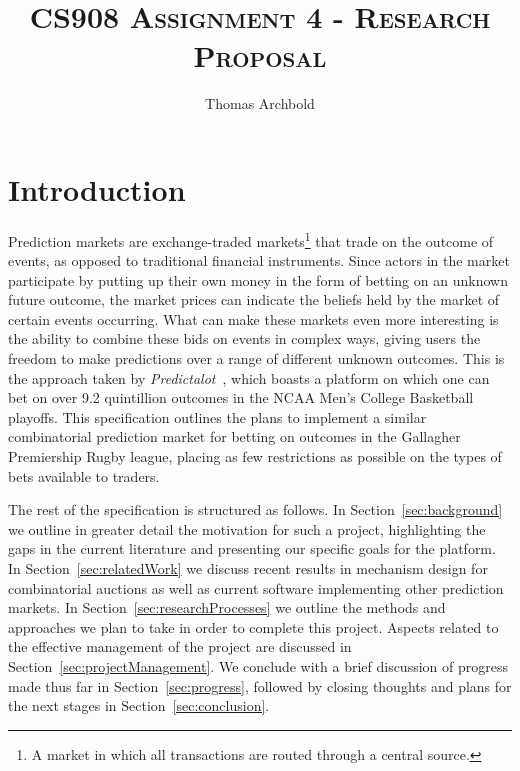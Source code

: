 \documentclass[10pt,a4paper]{article}
\title{\textsc{CS908 Assignment 4 - Research Proposal}}
\author{Thomas Archbold}
\date{}
\theoremstyle{plain}
\theoremstyle{definition}
\begin{document}
\maketitle



\section{Introduction}

Prediction markets are exchange-traded markets\footnote{A market in which all
transactions are routed through a central source.} that trade on the outcome of
events, as opposed to traditional financial instruments. Since actors in the
market participate by putting up their own money in the form of betting on an
unknown future outcome, the market prices can indicate the beliefs held by the
market of certain events occurring. What can make these markets even more
interesting is the ability to combine these bids on events in complex ways,
giving users the freedom to make predictions over a range of different unknown
outcomes. This is the approach taken by \emph{Predictalot}~\cite{Predictalot},
which boasts a platform on which one can bet on over 9.2 quintillion outcomes
in the NCAA Men's College Basketball playoffs. This specification outlines the
plans to implement a similar combinatorial prediction market for betting on
outcomes in the Gallagher Premiership Rugby league, placing as few restrictions
as possible on the types of bets available to traders.

The rest of the specification is structured as follows. In
Section~\ref{sec:background} we outline in greater detail the motivation for
such a project, highlighting the gaps in the current literature and presenting
our specific goals for the platform. In Section~\ref{sec:relatedWork} we
discuss recent results in mechanism design for combinatorial auctions as well
as current software implementing other prediction markets. In
Section~\ref{sec:researchProcesses} we outline the methods and approaches we
plan to take in order to complete this project. Aspects related to the
effective management of the project are discussed in
Section~\ref{sec:projectManagement}. We conclude with a brief discussion of
progress made thus far in Section~\ref{sec:progress}, followed by closing
thoughts and plans for the next stages in Section~\ref{sec:conclusion}.
\end{document}
